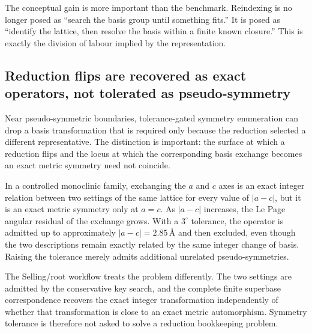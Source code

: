 \documentclass[11pt]{article}
\newcommand{\Ang}{\text{\AA}}
\begin{document}
The conceptual gain is more important than the benchmark. Reindexing is no longer posed as ``search the basis group until something fits.'' It is posed as ``identify the lattice, then resolve the basis within a finite known closure.'' This is exactly the division of labour implied by the representation.

\subsection{Reduction flips are recovered as exact operators, not tolerated as pseudo-symmetry}

Near pseudo-symmetric boundaries, tolerance-gated symmetry enumeration can drop a basis transformation that is required only because the reduction selected a different representative. The distinction is important: the surface at which a reduction flips and the locus at which the corresponding basis exchange becomes an exact metric symmetry need not coincide.

In a controlled monoclinic family, exchanging the $a$ and $c$ axes is an exact integer relation between two settings of the same lattice for every value of $|a-c|$, but it is an exact metric symmetry only at $a=c$. As $|a-c|$ increases, the Le Page angular residual of the exchange grows. With a $3^\circ$ tolerance, the operator is admitted up to approximately $|a-c|=2.85\,\Ang$ and then excluded, even though the two descriptions remain exactly related by the same integer change of basis. Raising the tolerance merely admits additional unrelated pseudo-symmetries.

The Selling/root workflow treats the problem differently. The two settings are admitted by the conservative key search, and the complete finite superbase correspondence recovers the exact integer transformation independently of whether that transformation is close to an exact metric automorphism. Symmetry tolerance is therefore not asked to solve a reduction bookkeeping problem.
\end{document}
